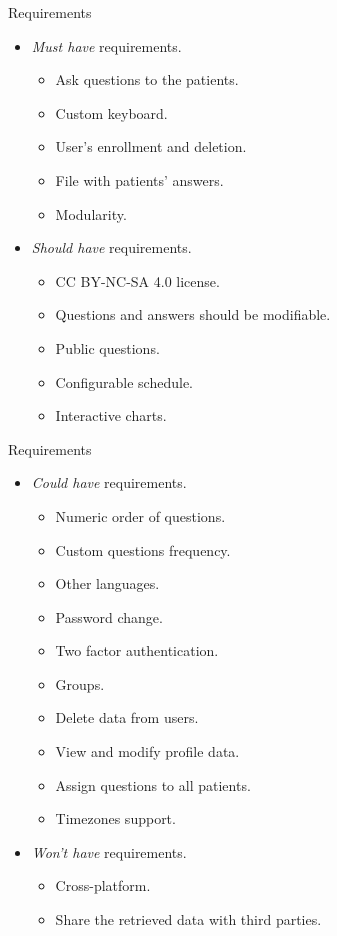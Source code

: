 \documentclass{beamer}
\begin{document}
\begin{frame}[fragile]{Requirements}
  \begin{itemize}[<+->]
    \item \emph{Must have} requirements.
      \begin{itemize}[<+->]
        \item Ask questions to the patients.
        \item Custom keyboard.
        \item User's enrollment and deletion.
        \item File with patients' answers.
        \item Modularity.
      \end{itemize}
    \item \emph{Should have} requirements.
      \begin{itemize}[<+->]
        \item CC BY-NC-SA 4.0 \cite{CC} license.
        \item Questions and answers should be modifiable.
        \item Public questions.
        \item Configurable schedule.
        \item Interactive charts.
       \end{itemize}
  \end{itemize}
\end{frame}
\begin{frame}[fragile]{Requirements}
  \begin{itemize}[<+->]
    \item \emph{Could have} requirements.
          \begin{itemize}[<+->]
            \item Numeric order of questions.
            \item Custom questions frequency.
            \item Other languages.
            \item Password change.
            \item Two factor authentication.
            \item Groups.
            \item Delete data from users.
            \item View and modify profile data.
            \item Assign questions to all patients.
            \item Timezones support.
          \end{itemize}
        \item \emph{Won't have} requirements.
          \begin{itemize}[<+->]
            \item Cross-platform.
            \item Share the retrieved data with third parties.
          \end{itemize}
  \end{itemize}
\end{frame}
\end{document}
